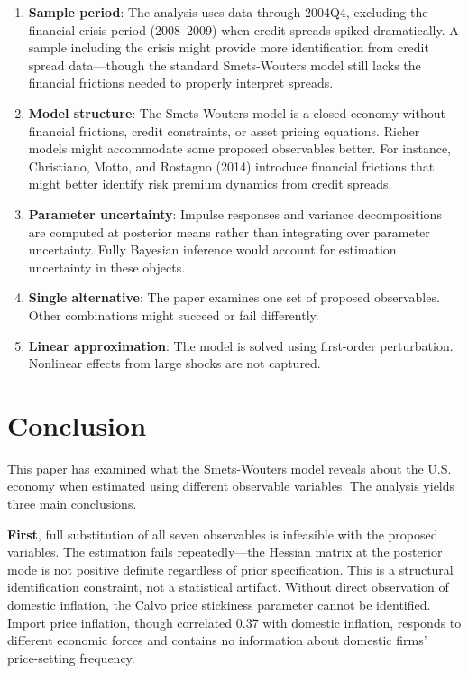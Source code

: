 \documentclass[12pt]{article}
\begin{document}
\begin{enumerate}
    \item \textbf{Sample period}: The analysis uses data through 2004Q4, excluding the financial crisis period (2008--2009) when credit spreads spiked dramatically. A sample including the crisis might provide more identification from credit spread data---though the standard Smets-Wouters model still lacks the financial frictions needed to properly interpret spreads.
    
    \item \textbf{Model structure}: The Smets-Wouters model is a closed economy without financial frictions, credit constraints, or asset pricing equations. Richer models might accommodate some proposed observables better. For instance, Christiano, Motto, and Rostagno (2014) introduce financial frictions that might better identify risk premium dynamics from credit spreads.
    
    \item \textbf{Parameter uncertainty}: Impulse responses and variance decompositions are computed at posterior means rather than integrating over parameter uncertainty. Fully Bayesian inference would account for estimation uncertainty in these objects.
    
    \item \textbf{Single alternative}: The paper examines one set of proposed observables. Other combinations might succeed or fail differently.
    
    \item \textbf{Linear approximation}: The model is solved using first-order perturbation. Nonlinear effects from large shocks are not captured.
\end{enumerate}

\section{Conclusion}

This paper has examined what the Smets-Wouters model reveals about the U.S. economy when estimated using different observable variables. The analysis yields three main conclusions.

\textbf{First}, full substitution of all seven observables is infeasible with the proposed variables. The estimation fails repeatedly---the Hessian matrix at the posterior mode is not positive definite regardless of prior specification. This is a structural identification constraint, not a statistical artifact. Without direct observation of domestic inflation, the Calvo price stickiness parameter cannot be identified. Import price inflation, though correlated 0.37 with domestic inflation, responds to different economic forces and contains no information about domestic firms' price-setting frequency.
\end{document}
